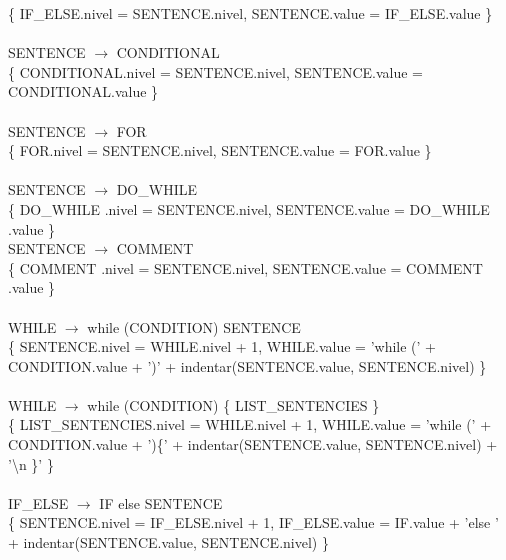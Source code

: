 \documentclass[10pt,a4paper]{article}
\begin{document}
\{ IF\_ELSE.nivel = SENTENCE.nivel, SENTENCE.value = IF\_ELSE.value \}  \\ \\

SENTENCE $\rightarrow$  CONDITIONAL  \\ 

\{ CONDITIONAL.nivel = SENTENCE.nivel, SENTENCE.value = CONDITIONAL.value \}  \\ \\

SENTENCE $\rightarrow$  FOR \\ 

\{ FOR.nivel = SENTENCE.nivel, SENTENCE.value = FOR.value \}  \\ \\

SENTENCE $\rightarrow$  DO\_WHILE \\ 

\{ DO\_WHILE .nivel = SENTENCE.nivel, SENTENCE.value = DO\_WHILE .value \}  \\
  
SENTENCE $\rightarrow$  COMMENT \\ 

\{ COMMENT .nivel = SENTENCE.nivel, SENTENCE.value = COMMENT .value \}  \\ \\


WHILE $\rightarrow$ while (CONDITION) SENTENCE \\  

\{ SENTENCE.nivel = WHILE.nivel + 1, WHILE.value = 'while (' + CONDITION.value + ')' + indentar(SENTENCE.value, SENTENCE.nivel) \}  \\ \\

WHILE $\rightarrow$ while (CONDITION) \{ LIST\_SENTENCIES \}  \\

\{ LIST\_SENTENCIES.nivel = WHILE.nivel + 1, WHILE.value = 'while (' + CONDITION.value + ')\{' + indentar(SENTENCE.value, SENTENCE.nivel) + '\textbackslash{}n \}' \} \\ \\

IF\_ELSE $\rightarrow$ IF else SENTENCE   \\

\{ SENTENCE.nivel = IF\_ELSE.nivel + 1, IF\_ELSE.value = IF.value + 'else ' + indentar(SENTENCE.value, SENTENCE.nivel) \}  \\ \\
\end{document}

